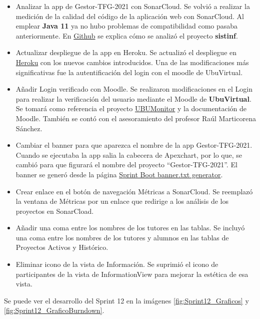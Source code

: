 \begin{itemize}
	\item Analizar la app de Gestor-TFG-2021 con SonarCloud. 
		Se volvió a realizar la medición de la calidad del código de la aplicación web con SonarCloud. Al emplear \textbf{Java 11} ya no hubo problemas de compatibilidad como pasaba anteriormente. En \href{https://github.com/dbo1001/Gestor-TFG-2021/issues/142}{Github} se explica cómo se analizó el proyecto \textbf{sistinf}.
	\item Actualizar despliegue de la app en Heroku.
		Se actualizó el despliegue en \href{https://gestor-tfg-2021.herokuapp.com/}{Heroku} con los nuevos cambios introducidos. Una de las modificaciones más significativas fue la autentificación del login con el moodle de UbuVirtual.
	\item Añadir Login verificado con Moodle. 
		Se realizaron modificaciones en el Login para realizar la verificación del usuario mediante el Moodle de \textbf{UbuVirtual}. Se tomará como referencia el proyecto \href{https://github.com/yjx0003/UBUMonitor}{UBUMonitor} y la documentación de Moodle. También se contó con el asesoramiento del profesor Raúl Marticorena Sánchez.
	\item Cambiar el banner para que aparezca el nombre de la app Gestor-TFG-2021.
		Cuando se ejecutaba la app salia la cabecera de Apexchart, por lo que, se cambió para que figurará el nombre del proyecto ``Gestor-TFG-2021''. El banner se generó desde la página \href{https://devops.datenkollektiv.de/banner.txt/index.html}{Sprint Boot banner.txt generator}.
	\item Crear enlace en el botón de navegación Métricas a SonarCloud.
		Se reemplazó la ventana de Métricas por un enlace que redirige a los análisis de los proyectos en SonarCload.
	\item Añadir una coma entre los nombres de los tutores en las tablas.
		Se incluyó una coma entre los nombres de los tutores y alumnos en las tablas de Proyectos Activos y Histórico.
	\item Eliminar icono de la vista de Información.
		Se suprimió el icono de participantes de la vista de InformationView para mejorar la estética de esa vista.
\end{itemize}

Se puede ver el desarrollo del Sprint 12 en la imágenes \ref{fig:Sprint12_Graficos} y \ref{fig:Sprint12_GraficoBurndown}.



